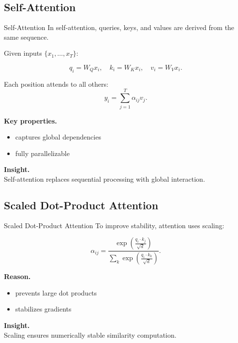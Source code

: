 \documentclass[aspectratio=169,11pt]{beamer}
\begin{document}
\subsection{Self-Attention}
\begin{frame}[t,allowframebreaks]{Self-Attention}
\small
In self-attention, queries, keys, and values are derived from the same sequence.

Given inputs $\{x_1, \dots, x_T\}$:

\[
q_i = W_Q x_i, \quad k_i = W_K x_i, \quad v_i = W_V x_i.
\]

Each position attends to all others:
\[
y_i = \sum_{j=1}^{T} \alpha_{ij} v_j.
\]

\textbf{Key properties.}\\ \begin{itemize}
    \item captures global dependencies
    \item fully parallelizable
\end{itemize}

\textbf{Insight.}\\ Self-attention replaces sequential processing with global interaction.
\end{frame}

\subsection{Scaled Dot-Product Attention}
\begin{frame}[t,allowframebreaks]{Scaled Dot-Product Attention}
\small
To improve stability, attention uses scaling:

\[
\alpha_{ij} =
\frac{\exp\left(\frac{q_i \cdot k_j}{\sqrt{d}}\right)}
{\sum_{k} \exp\left(\frac{q_i \cdot k_k}{\sqrt{d}}\right)}.
\]

\textbf{Reason.}\\ \begin{itemize}
    \item prevents large dot products
    \item stabilizes gradients
\end{itemize}

\textbf{Insight.}\\ Scaling ensures numerically stable similarity computation.
\end{frame}
\end{document}
